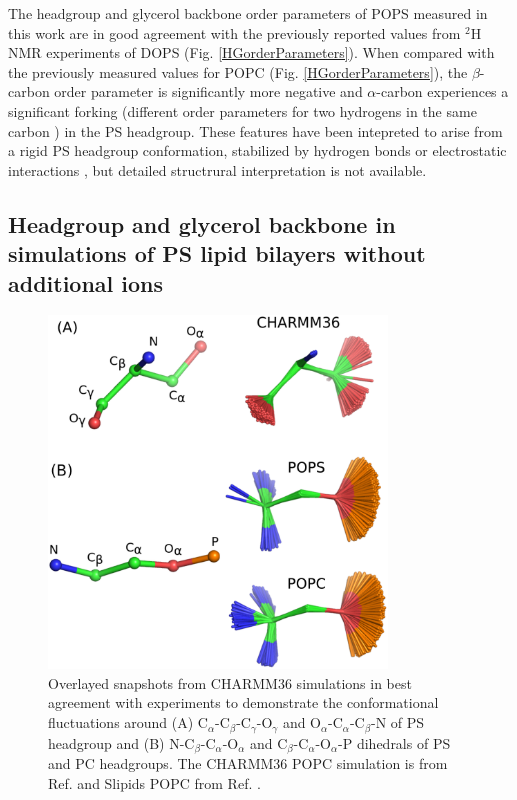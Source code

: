 \documentclass[aps,prl,superscriptaddress,twocolumn]{revtex4}
\begin{document}
The headgroup and glycerol backbone order parameters of 
POPS measured in this work are in good agreement with the previously reported
values from $^2$H NMR experiments of DOPS \cite{browning80} (Fig. \ref{HGorderParameters}).
When compared with the previously measured values for POPC \cite{ferreira13} (Fig. \ref{HGorderParameters}),
the $\beta$-carbon order parameter is significantly more negative and $\alpha$-carbon
experiences a significant forking (different order parameters for two hydrogens in the same carbon \cite{ollila16}) in the PS headgroup.
These features have been intepreted to arise from a rigid PS headgroup
conformation, stabilized by hydrogen bonds or electrostatic
interactions \cite{browning80,buldt81}, but detailed structrural interpretation is not
available. 




\subsection{Headgroup and glycerol backbone in simulations of PS lipid bilayers without additional ions}

\begin{figure}[]
  \centering
  \includegraphics[width=9.0cm]{../Figs/structures.eps}
  \caption{\label{HGstructuresPSandPC}
    Overlayed snapshots from CHARMM36 simulations in best agreement with experiments
    to demonstrate the conformational fluctuations around
    (A) C$_\alpha$-C$_\beta$-C$_\gamma$-O$_\gamma$ and  O$_\alpha$-C$_\alpha$-C$_\beta$-N
    of PS headgroup and (B) N-C$_\beta$-C$_\alpha$-O$_\alpha$ and C$_\beta$-C$_\alpha$-O$_\alpha$-P
    dihedrals of PS and PC headgroups.
    The CHARMM36 POPC simulation is from Ref.  and Slipids POPC from Ref. .
  }
\end{figure}
\end{document}
